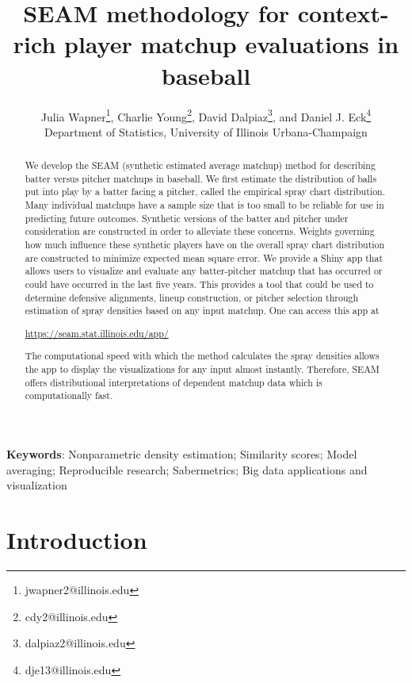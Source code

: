\documentclass[12pt]{article}
\title{SEAM methodology for context-rich player matchup evaluations in baseball}
\author{Julia Wapner\thanks{jwapner2@illinois.edu}, 
Charlie Young\thanks{cdy2@illinois.edu}, 
David Dalpiaz\thanks{dalpiaz2@illinois.edu},
and Daniel J. Eck\thanks{dje13@illinois.edu} \\[1em]
Department of Statistics, University of Illinois Urbana-Champaign
}
\date{}
\begin{document}
\maketitle

\begin{abstract}
We develop the SEAM (synthetic estimated average matchup) method for describing batter versus pitcher matchups in baseball. We first estimate the distribution of balls put into play by a batter facing a pitcher, called the empirical spray chart distribution. Many individual matchups have a sample size that is too small to be reliable for use in predicting future outcomes. Synthetic versions of the batter and pitcher under consideration are constructed in order to alleviate these concerns. Weights governing how much influence these synthetic players have on the overall spray chart distribution are constructed to minimize expected mean square error. We provide a Shiny app that allows users to visualize and evaluate any batter-pitcher matchup that has occurred or could have occurred in the last five years. This provides a tool that could be used to determine defensive alignments, lineup construction, or pitcher selection through estimation of spray densities based on any input matchup. One can access this app at \begin{center}
\url{https://seam.stat.illinois.edu/app/}
\end{center} 
The computational speed with which the method calculates the spray densities allows the app to display the visualizations for any input almost instantly. Therefore, SEAM offers distributional interpretations of dependent matchup data which is computationally fast.
\end{abstract}

\noindent\textbf{Keywords}: Nonparametric density estimation; Similarity scores; Model averaging; Reproducible research; Sabermetrics; Big data applications and visualization


\section{Introduction}
\end{document}
